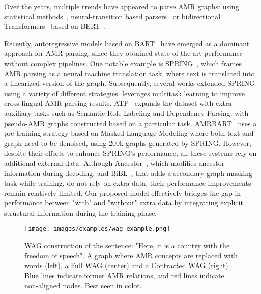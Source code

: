 \documentclass[11pt]{article}
\begin{document}
Over the years, multiple trends have appeared to parse AMR graphs: using statistical methods~\citep{flanigan-etal-2014-discriminative, flanigan-etal-2016-cmu, wang-etal-2015-boosting}, neural-transition based parsers~\citep{ballesteros-al-onaizan-2017-amr, liu-etal-2018-amr, fernandez-astudillo-etal-2020-transition, zhou-etal-2021-amr} or bidirectional Transformers~\citep{lyu-titov-2018-amr, zhang-etal-2019-amr, cai-lam-2020-amr} based on BERT~\citep{devlin-etal-2019-bert}.

Recently, autoregressive models based on BART~\cite{lewis-etal-2020-bart} have emerged as a dominant approach for AMR parsing, since they obtained state-of-the-art performance without complex pipelines. One notable example is SPRING~\cite{bevilacqua-etal-2021-one}, which frames AMR parsing as a neural machine translation task, where text is translated into a linearized version of the graph. Subsequently, several works extended SPRING using a variety of different strategies. \citet{procopio-etal-2021-sgl} leverages multitask learning to improve cross-lingual AMR parsing results. ATP~\cite{naacl-amrize-2021} expands the dataset with extra auxiliary tasks such as Semantic Role Labeling and Dependency Parsing, with pseudo-AMR graphs constructed based on a particular task. AMRBART~\cite{bai-etal-2022-graph} uses a pre-training strategy based on Masked Language Modeling where both text and graph need to be denoised, using 200k graphs generated by SPRING. However, despite their efforts to enhance SPRING's performance, all these systems rely on additional external data.  Although Ancestor~\cite{yu-gildea-2022-sequence}, which modifies ancestor information during decoding, and BiBL~\cite{cheng-etal-2022-bibl},  that adds a secondary graph masking task while training, do not rely on extra data, their performance improvements remain relatively limited. Our proposed model effectively bridges the gap in performance between "with" and "without" extra data by integrating explicit structural information during the training phase.

\begin{figure*}[!htp]
  \centering
  \texttt{[image: images/examples/wag-example.png]}

  \caption{WAG construction of the sentence: "Here, it is a country with the freedom of speech". A graph where AMR concepts are replaced with words (left), a Full WAG (center) and a Contracted WAG (right). Blue lines indicate former AMR relations, and red lines indicate non-aligned nodes. Best seen in color.}
  \label{fig:wag-construction}
\end{figure*}
\end{document}
